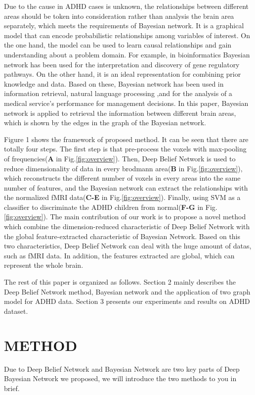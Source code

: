\documentclass[10pt,twocolumn,letterpaper]{article}
\begin{document}
Due to the cause in ADHD cases is unknown, the relationships between different areas should be token into consideration rather than analysis the brain area separately, which meets the requirements of Bayesian network. It is a graphical model that can encode probabilistic relationships among variables of interest. On the one hand, the model can be used to learn causal relationships and gain understanding about a problem domain. For example, in bioinformatics Bayesian network has been used for the interpretation and discovery of gene regulatory pathways\cite{14}. On the other hand, it is an ideal representation for combining prior knowledge and data. Based on these, Bayesian network has been used in information retrieval\cite{15}, natural language processing\cite{16} ,and for the analysis of a medical service's performance for management decisions\cite{17}. In this paper, Bayesian network is applied to retrieval the information between different brain areas, which is shown by the edges in the graph of the Bayesian network.  

 
Figure 1 shows the framework of proposed method. It can be seen that there are totally four steps. The first step is that pre-process the
voxels with max-pooling of frequencies(\textbf{A} in Fig.\ref{fig:overview}). Then, Deep Belief Network is used to reduce dimensionality of data in every brodmann area(\textbf{B} in Fig.\ref{fig:overview}), which reconstructs the different number of voxels in every areas into the same number of features, and the Bayesian network can extract the relationships with the normalized fMRI data(\textbf{C-E} in Fig.\ref{fig:overview}). Finally, using SVM as a classifier to discriminate the ADHD children from normal(\textbf{F-G} in Fig.\ref{fig:overview}). The main contribution of our work is to propose a novel method which combine the dimension-reduced characteristic of Deep Belief Network with the global feature-extracted  characteristic of Bayesian Network. Based on this two characteristics, Deep Belief Network can deal with the huge amount of datas, such as fMRI data. In addition, the features extracted are global, which can represent the whole brain.

The rest of this paper is organized as follows. Section 2 mainly describes the Deep Belief Network method, Bayesian network and the application of two graph model for ADHD data. Section 3 presents our experiments and results on ADHD dataset.

\section{METHOD}
Due to Deep Belief Network and Bayesian Network are two key parts of Deep Bayesian Network we proposed, we will introduce the two methods to you in brief.
\end{document}
